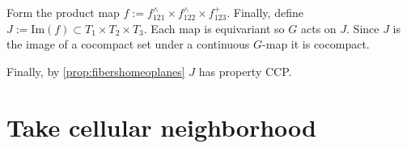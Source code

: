 \documentclass[12pt,parskip=full]{report}
\theoremstyle{plain}
\theoremstyle{definition}
\begin{document}
        Form the product map \(f:= f_{121}^{\wedge} \times f_{122}^{\wedge} \times f_{123}^{+}\). Finally, define \(J := \text{Im}(f) \subset T_1\times T_2\times T_3\). Each map is equivariant so \(G\) acts on \(J\). Since \(J\) is the image of a cocompact set under a continuous \(G\)-map it is cocompact. 
        
        Finally, by \ref{prop:fibershomeoplanes} \(J\) has property CCP.
    

    
        
        
        
        
        
        
        
        
        
    \section{Take cellular neighborhood}
        
\end{document}
